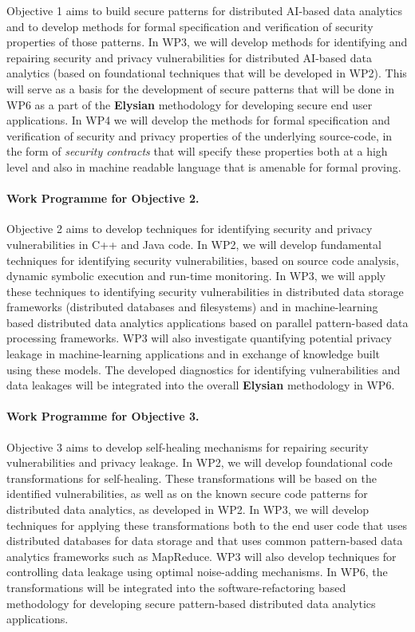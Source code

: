 \documentclass[a4paper,11pt]{article}
\newcommand{\project}[1]{\textbf{#1}\xspace}
\newcommand{\SECURITY}{\project{Elysian}}
\newcommand{\TheProject}{\SECURITY}
\begin{document}
Objective 1 aims to build secure patterns for distributed AI-based data analytics and to develop methods for formal specification and verification of security properties of those patterns. In WP3, we will develop methods for identifying and repairing security and privacy vulnerabilities for distributed AI-based data analytics (based on foundational techniques that will be developed in WP2). This will serve as a basis for the development of secure patterns that will be done in WP6 as a part of the \TheProject{} methodology for developing secure end user applications. In WP4 we will develop the methods for formal specification and verification of security and privacy properties of the underlying source-code, in the form of \emph{security contracts} that will specify these properties both at a high level and also in machine readable language that is amenable for formal proving. 

\paragraph*{Work Programme for Objective 2.}

Objective 2 aims to develop techniques for identifying security and privacy vulnerabilities in C++ and Java code. In WP2, we will develop fundamental techniques for identifying security vulnerabilities, based on source code analysis, dynamic symbolic execution and run-time monitoring. In WP3, we will apply these techniques to identifying security vulnerabilities in distributed data storage frameworks (distributed databases and filesystems) and in machine-learning based distributed data analytics applications based on parallel pattern-based data processing frameworks. WP3 will also investigate quantifying potential privacy leakage in machine-learning applications and in exchange of knowledge built using these models. The developed diagnostics for identifying vulnerabilities and data leakages will be integrated into the overall \TheProject{} methodology in WP6.

\paragraph{Work Programme for Objective 3.}

Objective 3 aims to develop self-healing mechanisms for repairing security vulnerabilities and privacy leakage. In WP2, we will develop foundational code transformations for self-healing. These transformations will be based on the identified vulnerabilities, as well as on the known secure code patterns for distributed data analytics, as developed in WP2. In WP3, we will develop techniques for applying these transformations both to the end user code that uses distributed databases for data storage and that uses common pattern-based data analytics frameworks such as MapReduce. WP3 will also develop techniques for controlling data leakage using optimal noise-adding mechanisms. In WP6, the transformations will be integrated into the software-refactoring based methodology for developing secure pattern-based distributed data analytics applications. 
\end{document}
